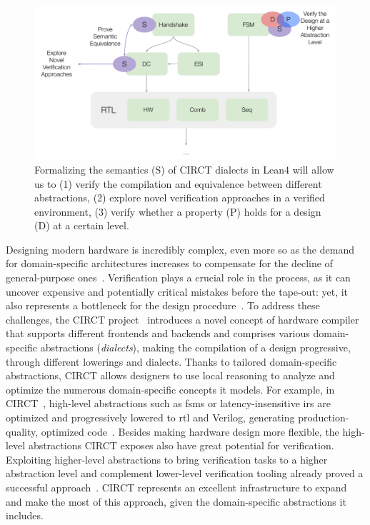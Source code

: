 \documentclass[sigconf,authorversion,nonacm, 11pt]{acmart}
\begin{document}
\begin{figure}[ht]
    \includegraphics[scale=0.8]{semantics.pdf}
    \caption{Formalizing the semantics (S) of CIRCT dialects in Lean4 will allow us to (1) verify the compilation and equivalence 
    between different abstractions, (2) explore novel verification approaches in a verified environment, (3) verify whether a property
    (P) holds for a design (D) at a certain level.}
    \label{fig:semantics}
\end{figure}
Designing modern hardware is incredibly complex, even more so as the demand for domain-specific architectures increases to compensate for the decline of general-purpose ones~\cite{asanovic2006landscape, hennessy2018new}. 
Verification plays a crucial role in the process, as it can uncover expensive and potentially critical mistakes before the tape-out: yet, it also represents a bottleneck for the design procedure~\cite{foster2013design, wilson2020verifstudy, vasudevan2021learning}. 
To address these challenges, the CIRCT project~\cite{circt, mlir_circt} introduces a novel concept of hardware compiler that supports different frontends and backends and comprises various domain-specific abstractions (\textit{dialects}), making the compilation of a design progressive, through different lowerings and dialects. 
Thanks to tailored domain-specific abstractions, CIRCT allows designers to use local reasoning to analyze and optimize the numerous domain-specific concepts it models.
For example, in CIRCT~\cite{circt, mlir_circt}, high-level abstractions such as \acp{fsm} or latency-insensitive \acp{ir} are optimized and progressively lowered to \ac{rtl} and Verilog, generating production-quality, optimized code~\cite{circt_sifive}. 
Besides making hardware design more flexible, the high-level abstractions CIRCT exposes also have great potential for verification.
Exploiting higher-level abstractions to bring verification tasks to a higher abstraction level and complement lower-level verification tooling already proved a successful approach~\cite{huang2018instruction, mattarei2018cosa, hunt2006sat}.
CIRCT represents an excellent infrastructure to expand and make the most of this approach, given the domain-specific abstractions it includes.
\end{document}
